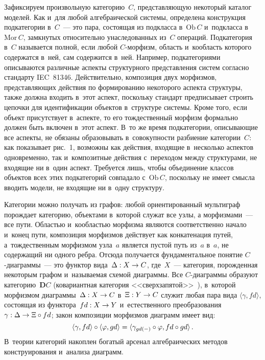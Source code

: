 \begin{multicols}{2}
   Зафиксируем произвольную категорию~$C$, представляющую некоторый 
каталог моделей. Как и~для любой алгебраической системы, определена 
конструкция подкатегории в~$C$~--- это пара, состоящая из подкласса 
в~$\mathrm{Ob}\,C$ и~подкласса в~$\mathrm{Mor}\,C$, замкнутых 
относительно унаследованных из~$C$ операций. Подкатегория в~$C$ 
называется полной, если любой \mbox{$C$-мор}\-физм, область и~кообласть которого 
содержатся в~ней, сам содержится в~ней. Например, подкатегориями 
описываются различные аспекты структурного представления систем согласно 
стандарту IEC~81346. Действительно, композиция двух морфизмов, 
представляющих действия по формированию некоторого аспекта структуры, 
также должна входить в~этот аспект, поскольку стандарт предписывает строить 
цепочки для идентификации объектов в~структуре системы. Кроме того, если 
объект присутствует в~аспекте, то его тождественный морфизм формально 
должен быть включен в~этот аспект. В~то же время подкатегории, 
опи\-сы\-ва\-ющие все аспекты, не обязаны образовывать в~совокупности разбиение 
категории~$C$: как показывает рис.~1, возможны как действия, входящие 
в~несколько аспектов одновременно, так и~композитные действия с~переходом 
между структурами, не входящие ни в~один аспект. Требуется лишь, чтобы 
объединение классов объектов всех этих подкатегорий совпадало 
с~$\mathrm{Ob}\,C$, поскольку не имеет смысла вводить модели, не входящие 
ни в~одну структуру.
   
   Категории можно получать из графов: любой ориентированный мультиграф 
порождает категорию, объектами в~которой служат все узлы, а морфизмами~--- 
все пути. Областью и~кообластью морфизма являются соответственно начало 
и~конец пути, композиция морфизмов действует как конкатенация путей, 
а~тождественным морфизмом узла~$a$ является пустой путь из~$a$ в~$a$, не 
содержащий ни одного ребра. Отсюда получается фундаментальное понятие  
$C$-диа\-грам\-мы~--- это функтор вида~$\Delta : X \hm\to C$, где~$X$~--- 
категория, порожденная некоторым графом и~называемая схемой диаграммы. 
Все $C$-диа\-грам\-мы образуют категорию~$\mathbf{D}C$ (ковариантная 
категория <<сверхзапятой>>~\cite{14-kov}), в~которой морфизмом 
диаграммы~$\Delta : X \hm\to C$ в~$\Xi : Y \hm\to C$ служит любая пара 
вида $\langle\gamma, fd\rangle$, состоящая из функтора~$fd : X\hm\to Y$ 
и~естественного преобразования~$\gamma : \Delta\hm\to \Xi \circ fd$; закон 
композиции морфизмов диаграмм имеет вид:
$$
\langle \gamma, fd\rangle \circ 
\langle \varphi, gd\rangle \hm = \langle \gamma_{gd(-)} \circ \varphi, fd \circ 
gd\rangle\,.
$$ 
В~тео\-рии категорий накоплен богатый арсенал алгебраических 
методов конструирования и~анализа диаграмм.
   

\end{multicols}
